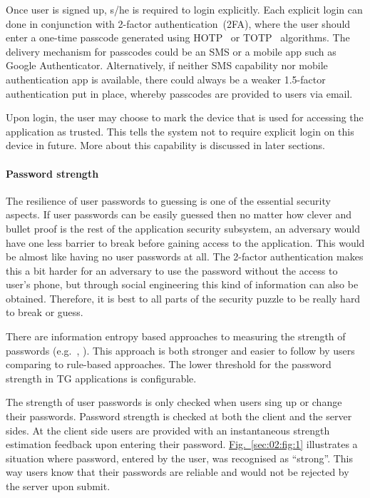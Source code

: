 \documentclass[a4paper,12pt,oneside,openright]{memoir}
\begin{document}
	Once user is signed up, s/he is required to login explicitly.
	Each explicit login can done in conjunction with 2-factor authentication~(2FA), where the user should enter a one-time passcode generated using HOTP~\cite{HOTP} or TOTP~\cite{TOTP} algorithms.
	The delivery mechanism for passcodes could be an SMS or a mobile app such as Google Authenticator.
	Alternatively, if neither SMS capability nor mobile authentication app is available, there could always be a weaker 1.5-factor authentication put in place, whereby passcodes are provided to users via email.

	Upon login, the user may choose to mark the device that is used for accessing the application as trusted.
	This tells the system not to require explicit login on this device in future.
	More about this capability is discussed in later sections.

\paragraph*{Password strength}
	The resilience of user passwords to guessing is one of the essential security aspects.
	If user passwords can be easily guessed then no matter how clever and bullet proof is the rest of the application security subsystem, an adversary would have one less barrier to break before gaining access to the application.
	This would be almost like having no user passwords at all.
	The 2-factor authentication makes this a bit harder for an adversary to use the password without the access to user's phone, but through social engineering this kind of information can also be obtained.
	Therefore, it is best to all parts of the security puzzle to be really hard to break or guess.

	There are information entropy based approaches to measuring the strength of passwords (e.g.~\cite{NIST}, \cite{DROPBOX}).
	This approach is both stronger and easier to follow by users comparing to rule-based approaches.
	The lower threshold for the password strength in TG applications is configurable.
	
	The strength of user passwords is only checked when users sing up or change their passwords.
	Password strength is checked at both the client and the server sides.
	At the client side users are provided with an instantaneous strength estimation feedback upon entering their password.
	\hyperref[sec:02:fig:1]{Fig.~\ref*{sec:02:fig:1}} illustrates a situation where password, entered by the user, was recognised as ``strong''.
	This way users know that their passwords are reliable and would not be rejected by the server upon submit.
\end{document}
